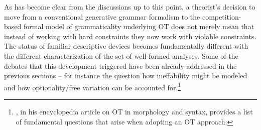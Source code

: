 \documentclass[output=paper,hidelinks]{langscibook}
\begin{document}
\begin{sloppypar}
As has become clear from the discussions up to this point, a theorist's decision to move from a conventional generative grammar formalism to the competition-based formal model of grammaticality underlying OT does not merely mean that instead of working with hard constraints they now work with violable constraints. The status of familiar descriptive devices becomes fundamentally different with the different characterization of the set of well-formed analyses. 
Some of the debates that this development triggered have been already addressed in the previous sections -- for instance the question how ineffability might be modeled and how optionality/free variation can be accounted for.\footnote{\citet{Wunderlich2006}, in his encyclopedia article on OT in morphology and syntax, provides a list of fundamental questions that arise when adopting an OT approach.} %
\end{sloppypar}
\end{document}
